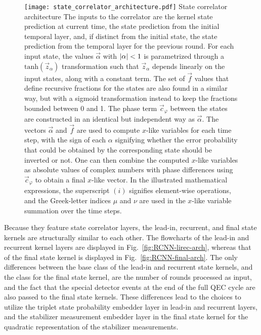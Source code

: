 \begin{figure*}[htb]
\centering
\texttt{[image: state\_correlator\_architecture.pdf]}
\ccaption
{State correlator architecture}
{
The inputs to the correlator are the kernel state prediction at current time, the state prediction from the initial temporal layer, and, if distinct from the initial state, the state prediction from the temporal layer for the previous round. For each input state, the values $\vec{\alpha}$ with $\lvert \alpha \rvert<1$ is parametrized through a $\mathrm{tanh}(\vec{z}_\alpha)$ transformation such that $\vec{z}_\alpha$ depends linearly on the input states, along with a constant term. The set of $\vec{f}$ values that define recursive fractions for the states are also found in a similar way, but with a sigmoid transformation instead to keep the fractions bounded between 0 and 1. The phase term $\vec{c}_\varphi$ between the states are constructed in an identical but independent way as $\vec{\alpha}$. The vectors $\vec{\alpha}$ and $\vec{f}$ are used to compute $x$-like variables for each time step, with the sign of each $\alpha$ signifying whether the error probability that could be obtained by the corresponding state should be inverted or not. One can then combine the computed $x$-like variables as absolute values of complex numbers with phase differences using $\vec{c}_\varphi$ to obtain a final $x$-like vector. In the illustrated mathematical expressions, the superscript $(i)$ signifies element-wise operations, and the Greek-letter indices $\mu$ and $\nu$ are used in the $x$-like variable summation over the time steps.
}
\label{fig:RCNN-state-corr}
\end{figure*}


Because they feature state correlator layers, the lead-in, recurrent, and final state kernels are structurally similar to each other. The flowcharts of the lead-in and recurrent kernel layers are displayed in Fig.~\ref{fig:RCNN-lirec-arch}, whereas that of the final state kernel is displayed in Fig.~\ref{fig:RCNN-final-arch}. The only differences between the base class of the lead-in and recurrent state kernels, and the class for the final state kernel, are the number of rounds processed as input, and the fact that the special detector events at the end of the full QEC cycle are also passed to the final state kernels. These differences lead to the choices to utilize the triplet state probability embedder layer in lead-in and recurrent layers, and the stabilizer measurement embedder layer in the final state kernel for the quadratic representation of the stabilizer measurements.


